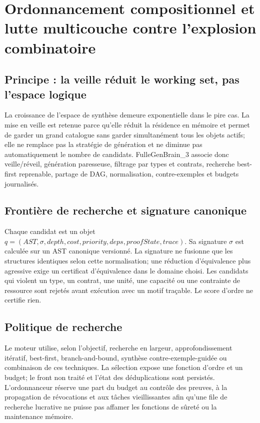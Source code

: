 \documentclass[11pt,a4paper]{article}
\begin{document}
\section{Ordonnancement compositionnel et lutte multicouche contre l'explosion combinatoire}
\subsection{Principe : la veille réduit le working set, pas l'espace logique}
La croissance de l'espace de synthèse demeure exponentielle dans le pire cas. La mise en veille est retenue parce qu'elle réduit la résidence en mémoire et permet de garder un grand catalogue sans garder simultanément tous les objets actifs; elle ne remplace pas la stratégie de génération et ne diminue pas automatiquement le nombre de candidats. FulleGenBrain\_3 associe donc veille/réveil, génération paresseuse, filtrage par types et contrats, recherche best-first reprenable, partage de DAG, normalisation, contre-exemples et budgets journalisés.

\subsection{Frontière de recherche et signature canonique}
Chaque candidat est un objet \(q=(AST,\sigma,depth,cost,priority,deps,proofState,trace)\). Sa signature \(\sigma\) est calculée sur un AST canonique versionné. La signature ne fusionne que les structures identiques selon cette normalisation; une réduction d'équivalence plus agressive exige un certificat d'équivalence dans le domaine choisi. Les candidats qui violent un type, un contrat, une unité, une capacité ou une contrainte de ressource sont rejetés avant exécution avec un motif traçable. Le score d'ordre ne certifie rien.

\subsection{Politique de recherche}
Le moteur utilise, selon l'objectif, recherche en largeur, approfondissement itératif, best-first, branch-and-bound, synthèse contre-exemple-guidée ou combinaison de ces techniques. La sélection expose une fonction d'ordre et un budget; le front non traité et l'état des déduplications sont persistés. L'ordonnanceur réserve une part du budget au contrôle des preuves, à la propagation de révocations et aux tâches vieillissantes afin qu'une file de recherche lucrative ne puisse pas affamer les fonctions de sûreté ou la maintenance mémoire.
\end{document}
